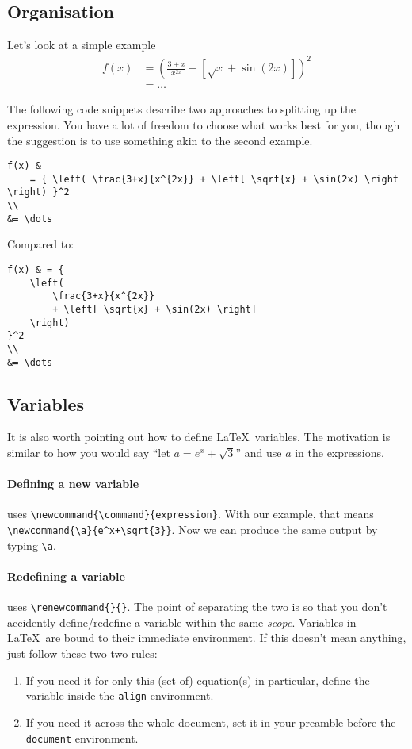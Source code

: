 \subsection{Organisation}
Let's look at a simple example 
\begin{align*}
    f(x) & = {
        \left( 
            \frac{3+x}{x^{2x}}
            + \left[ \sqrt{x} + \sin(2x) \right]
        \right)
    }^2
    \\
    &= \dots
\end{align*}

The following code snippets describe two approaches to splitting up the expression.
You have a lot of freedom to choose what works best for you, though the suggestion is to use something akin to the second example.
\begin{lstlisting}
f(x) &
    = { \left( \frac{3+x}{x^{2x}} + \left[ \sqrt{x} + \sin(2x) \right \right) }^2
\\
&= \dots
\end{lstlisting}
Compared to:
\begin{lstlisting}
f(x) & = {
    \left( 
        \frac{3+x}{x^{2x}}
        + \left[ \sqrt{x} + \sin(2x) \right]
    \right)
}^2
\\
&= \dots
\end{lstlisting}

\subsection{Variables}
It is also worth pointing out how to define \LaTeX\ variables.
The motivation is similar to how you would say ``let \(a = e^x+\sqrt{3}\)'' and use \(a\) in the expressions.

\paragraph{Defining a new variable} uses \verb|\newcommand{\command}{expression}|.
With our example, that means \verb|\newcommand{\a}{e^x+\sqrt{3}}|.
Now we can produce the same output by typing \verb|\a|.

\paragraph{Redefining a variable} uses \verb|\renewcommand{}{}|. The point of separating the two is so that you don't accidently define/redefine a variable within the same \emph{scope}.
Variables in \LaTeX\ are bound to their immediate environment.
If this doesn't mean anything, just follow these two two rules:
\begin{enumerate}
    \item If you need it for only this (set of) equation(s) in particular, define the variable inside the \verb|align| environment.
    \item If you need it across the whole document, set it in your preamble before the \texttt{document} environment.
\end{enumerate}

